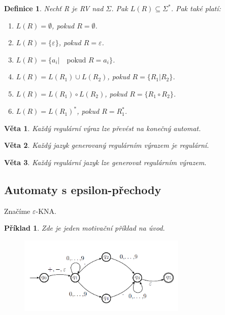\documentclass[10pt,a4paper]{article}
\theoremstyle{note}
\newtheorem{veta}{Věta}
\newtheorem{definice}{Definice}
\newtheorem{priklad}{Příklad}
\begin{document}
\begin{definice}
Nechť \textit{R} je RV nad $\Sigma$. Pak $L(R) \subseteq \Sigma^{*}$. Pak také platí:

\begin{enumerate}
\item\label{jazyky-1}
$L(R) = \emptyset$, pokud $R = \emptyset$.

\item
$L(R) = \lbrace \varepsilon \rbrace$, pokud $R = \varepsilon$.

\item\label{jazyky-3}
$L(R) = \lbrace a_{i} | \quad \text{pokud } R=a_{i} \rbrace$.

\item\label{jazyky-4}
$L(R) = L(R_{1}) \cup L(R_{2})$, pokud $R=\lbrace R_{1} | R_{2} \rbrace$. 

\item\label{jazyky-5}
$L(R) = L(R_{1}) \circ L(R_{2})$, pokud $R=\lbrace R_{1}\circ R_{2} \rbrace$.

\item\label{jazyky-6}
$L(R) = L(R_{1})^{*} $, pokud $R = R_{1}^{*}$.
\end{enumerate}
\end{definice}

\begin{veta}
Každý regulární výraz lze převést na konečný automat.
\end{veta}

\begin{veta}
Každý jazyk generovaný regulárním výrazem je regulární.
\end{veta}



\begin{veta}
Každý regulární jazyk lze generovat regulárním výrazem.
\end{veta}
	\subsection{Automaty s epsilon-přechody}
Značíme $\varepsilon$-KNA.
\begin{priklad}\label{priklad-5}
Zde je jeden motivační příklad na úvod.

\begin{figure}[H]
			\centering
			\includegraphics[width=8cm]{img/e.png}
			\end{figure}

\end{priklad}
\end{document}
